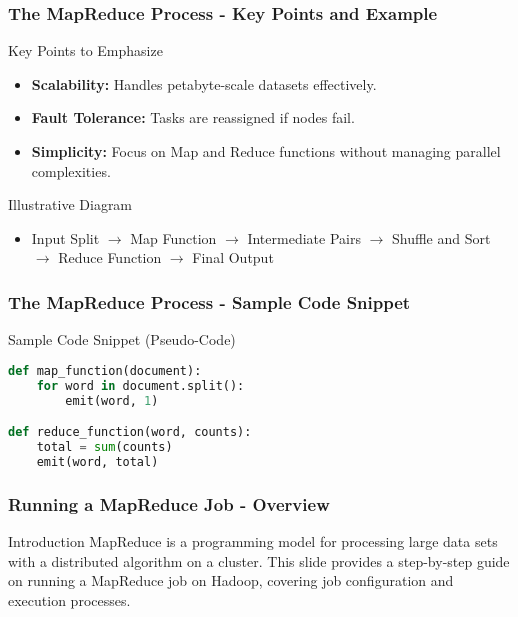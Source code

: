 \documentclass[aspectratio=169]{beamer}
\begin{document}
\begin{frame}[fragile]
    \frametitle{The MapReduce Process - Key Points and Example}
    \begin{block}{Key Points to Emphasize}
        \begin{itemize}
            \item \textbf{Scalability:} Handles petabyte-scale datasets effectively.
            \item \textbf{Fault Tolerance:} Tasks are reassigned if nodes fail.
            \item \textbf{Simplicity:} Focus on Map and Reduce functions without managing parallel complexities.
        \end{itemize}
    \end{block}
    \begin{block}{Illustrative Diagram}
        \begin{itemize}
            \item Input Split $\rightarrow$ Map Function $\rightarrow$ Intermediate Pairs $\rightarrow$ Shuffle and Sort $\rightarrow$ Reduce Function $\rightarrow$ Final Output
        \end{itemize}
    \end{block}
\end{frame}

\begin{frame}[fragile]
    \frametitle{The MapReduce Process - Sample Code Snippet}
    \begin{block}{Sample Code Snippet (Pseudo-Code)}
        \begin{lstlisting}[language=Python]
def map_function(document):
    for word in document.split():
        emit(word, 1)

def reduce_function(word, counts):
    total = sum(counts)
    emit(word, total)
        \end{lstlisting}
    \end{block}
\end{frame}

\begin{frame}[fragile]
    \frametitle{Running a MapReduce Job - Overview}
    \begin{block}{Introduction}
        MapReduce is a programming model for processing large data sets with a distributed algorithm on a cluster. 
        This slide provides a step-by-step guide on running a MapReduce job on Hadoop, covering job configuration and execution processes.
    \end{block}
\end{frame}
\end{document}
